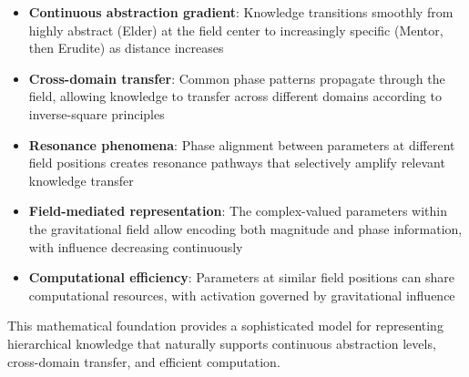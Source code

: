 \begin{itemize}
    \item \textbf{Continuous abstraction gradient}: Knowledge transitions smoothly from highly abstract (Elder) at the field center to increasingly specific (Mentor, then Erudite) as distance increases
    
    \item \textbf{Cross-domain transfer}: Common phase patterns propagate through the field, allowing knowledge to transfer across different domains according to inverse-square principles
    
    \item \textbf{Resonance phenomena}: Phase alignment between parameters at different field positions creates resonance pathways that selectively amplify relevant knowledge transfer
    
    \item \textbf{Field-mediated representation}: The complex-valued parameters within the gravitational field allow encoding both magnitude and phase information, with influence decreasing continuously
    
    \item \textbf{Computational efficiency}: Parameters at similar field positions can share computational resources, with activation governed by gravitational influence
\end{itemize}

This mathematical foundation provides a sophisticated model for representing hierarchical knowledge that naturally supports continuous abstraction levels, cross-domain transfer, and efficient computation.